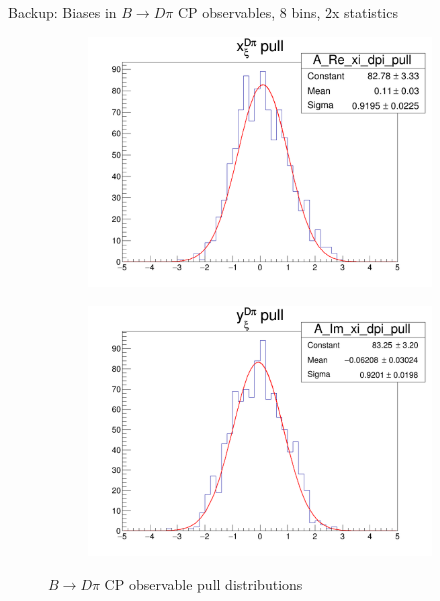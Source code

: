 \documentclass{beamer}
\begin{document}
\begin{frame}{Backup: Biases in $B\to D\pi$ CP observables, $8$ bins, $2$x statistics}
  \begin{figure}
    \centering
    \vspace{-0.2cm}
    \begin{subfigure}{0.5\textwidth}
      \includegraphics[width = 1.0\textwidth]{A_Re_xi_dpi_8Bins_StatsMultiplier2_pull.png}
    \end{subfigure}%
    \begin{subfigure}{0.5\textwidth}
      \includegraphics[width = 1.0\textwidth]{A_Im_xi_dpi_8Bins_StatsMultiplier2_pull.png}
    \end{subfigure}
    \caption{$B\to D\pi$ CP observable pull distributions}
  \end{figure}
\end{frame}
\end{document}
